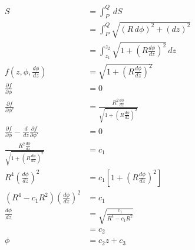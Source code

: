 \documentclass{article}
\begin{document}
\begin{align*}
  S                                                                                  & = \int_P^Q \,dS                                                                   \\
                                                                                     & = \int_P^Q \sqrt{(R \,d \phi)^2 + (d z)^2}                                        \\
                                                                                     & = \int_{z_1}^{z_2} \sqrt{1 + \left( R \frac{d \phi}{d z} \right)^2} \,d z         \\
  f \left( z, \phi, \frac{d \phi}{d z} \right)                                       & = \sqrt{1 + \left( R \frac{d \phi}{d z} \right)^2}                                \\
  \frac{\partial f}{\partial \phi}                                                   & = 0                                                                               \\
  \frac{\partial f}{\partial \phi'}                                                  & = \frac{R^2 \frac{d \phi}{d z}}{\sqrt{1 + \left( R \frac{d \phi}{d z} \right)^2}} \\
  \frac{\partial f}{\partial \phi} - \frac{d}{d z} \frac{\partial f}{\partial \phi'} & = 0                                                                               \\
  \frac{R^2 \frac{d \phi}{d z}}{\sqrt{1 + \left( R \frac{d \phi}{d z} \right)^2}}    & = c_1                                                                             \\
  R^4 \left( \frac{d \phi}{d z} \right)^2                                            & = c_1 \left[ 1 + \left( R \frac{d \phi}{d z} \right)^2 \right]                    \\
  (R^4 - c_1 R^2) \left( \frac{d \phi}{d z} \right)^2                                & = c_1                                                                             \\
  \frac{d \phi}{d z}                                                                 & = \sqrt{\frac{c_1}{R^4 - c_1 R^2}}                                                \\
                                                                                     & = c_2                                                                             \\
  \phi                                                                               & = c_2 z + c_3
\end{align*}
\end{document}
